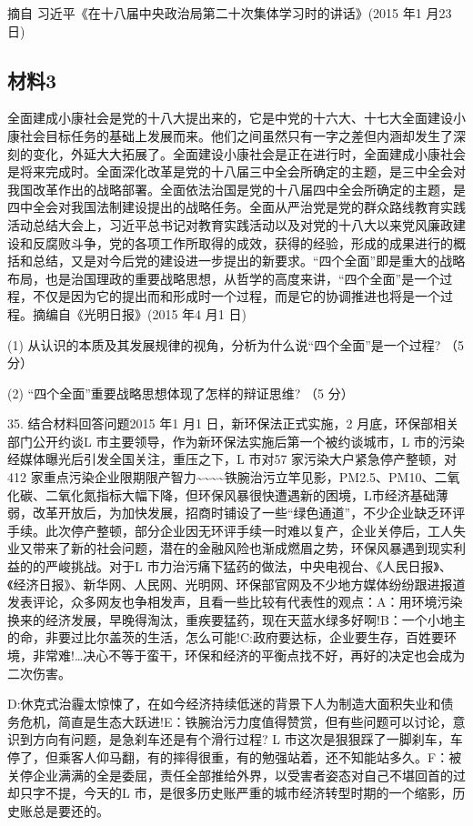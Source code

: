 \documentclass[UTF8,11pt]{ctexart}
\begin{document}
摘自 习近平《在十八届中央政治局第二十次集体学习时的讲话》(2015 年1 月23 日)

\subsection*{材料3}

全面建成小康社会是党的十八大提出来的，它是中党的十六大、十七大全面建设小康社会目标任务的基础上发展而来。他们之间虽然只有一字之差但内涵却发生了深刻的变化，外延大大拓展了。全面建设小康社会是正在进行时，全面建成小康社会是将来完成时。全面深化改革是党的十八届三中全会所确定的主题，是三中全会对我国改革作出的战略部署。全面依法治国是党的十八届四中全会所确定的主题，是四中全会对我国法制建设提出的战略任务。全面从严治党是党的群众路线教育实践活动总结大会上，习近平总书记对教育实践活动以及对党的十八大以来党风廉政建设和反腐败斗争，党的各项工作所取得的成效，获得的经验，形成的成果进行的概括和总结，又是对今后党的建设进一步提出的新要求。“四个全面”即是重大的战略布局，也是治国理政的重要战略思想，从哲学的高度来讲，“四个全面”是一个过程，不仅是因为它的提出而和形成时一个过程，而是它的协调推进也将是一个过程。摘编自《光明日报》(2015 年4 月1 日)


(1) 从认识的本质及其发展规律的视角，分析为什么说“四个全面”是一个过程? （5 分）


(2) “四个全面”重要战略思想体现了怎样的辩证思维? （5 分）


35. 结合材料回答问题2015 年1 月1 日，新环保法正式实施，2 月底，环保部相关部门公开约谈L 市主要领导，作为新环保法实施后第一个被约谈城市，L 市的污染经媒体曝光后引发全国关注，重压之下，L 市对57 家污染大户紧急停产整顿，对412 家重点污染企业限期限产智力\textasciitilde{}\textasciitilde{}\textasciitilde{}\textasciitilde{}铁腕治污立竿见影，PM2.5、PM10、二氧化碳、二氧化氮指标大幅下降，但环保风暴很快遭遇新的困境，L市经济基础薄弱，改革开放后，为加快发展，招商时铺设了一些“绿色通道”，不少企业缺乏环评手续。此次停产整顿，部分企业因无环评手续一时难以复产，企业关停后，工人失业又带来了新的社会问题，潜在的金融风险也渐成燃眉之势，环保风暴遇到现实利益的的严峻挑战。对于L 市力治污痛下猛药的做法，中央电视台、《人民日报》、《经济日报》、新华网、人民网、光明网、环保部官网及不少地方媒体纷纷跟进报道发表评论，众多网友也争相发声，且看一些比较有代表性的观点：A：用环境污染换来的经济发展，早晚得淘汰，重疾要猛药，现在天蓝水绿多好啊!B：一个小地主的命，非要过比尔盖茨的生活，怎么可能!C:政府要达标，企业要生存，百姓要环境，非常难!…决心不等于蛮干，环保和经济的平衡点找不好，再好的决定也会成为二次伤害。


D:休克式治霾太惊悚了，在如今经济持续低迷的背景下人为制造大面积失业和债务危机，简直是生态大跃进!E：铁腕治污力度值得赞赏，但有些问题可以讨论，意识到方向有问题，是急刹车还是有个滑行过程? L 市这次是狠狠踩了一脚刹车，车停了，但乘客人仰马翻，有的摔得很重，有的勉强站着，还不知能站多久。F：被关停企业满满的全是委屈，责任全部推给外界，以受害者姿态对自己不堪回首的过却只字不提，今天的L 市，是很多历史账严重的城市经济转型时期的一个缩影，历史账总是要还的。
\end{document}
